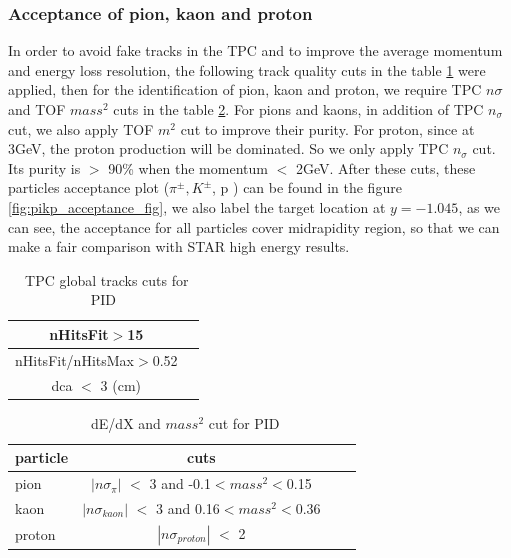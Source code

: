 \subsubsection{Acceptance of pion, kaon and proton}
In order to avoid fake tracks in the TPC and to improve the average momentum and energy loss resolution, the following track quality cuts in the table \ref{tab:tpc_cut_pid} were applied, then for the identification of pion, kaon and proton, we require TPC $n\sigma$ and TOF $mass^{2}$ cuts in the table \ref{tab:dedx_mass_cut_pid}. For pions and kaons, in addition of TPC $n_{\sigma}$ cut, we also apply TOF $m^{2}$ cut to improve their purity. For proton, since at 3GeV, the proton production will be dominated. So we only apply TPC $n_{\sigma}$ cut. Its purity is $>$ 90\% when the momentum $<$ 2GeV. After these cuts, these particles acceptance plot ($\pi^{\pm}, K^{\pm}$, p ) can be found in the figure \ref{fig:pikp_acceptance_fig}, we also label the target location at $y = -1.045$, as we can see, the acceptance for all particles cover midrapidity region, so that we can make a fair comparison with STAR high energy results.
 
 \begin{table}[ht]
\caption{\ TPC global tracks cuts for PID}
\label{tab:tpc_cut_pid}
\begin{tabular}{|c|c|}
\hline
nHitsFit$>$15 \\ \hline
nHitsFit/nHitsMax$>$0.52 \\ \hline
dca $<$ 3 (cm) \\ \hline
\end{tabular}
\end{table}


\begin{table}[ht]
\caption{\ dE/dX and $mass^{2}$ cut for PID}
\label{tab:dedx_mass_cut_pid}
\begin{tabular}{lclc|}
\hline
particle & cuts \\ \hline
pion  &  $|n\sigma_{\pi}|$ $<$ 3 and -0.1$<mass^{2}<$0.15 \\  \hline
kaon & $|n\sigma_{kaon}|$ $<$ 3 and 0.16$<mass^{2}<$0.36 \\ \hline
proton & $|n\sigma_{proton}|$ $<$ 2 \\ \hline
\end{tabular}
\end{table}

